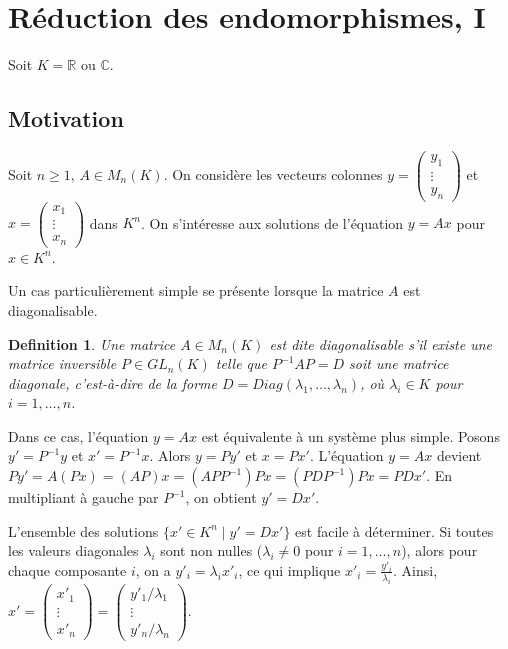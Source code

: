\documentclass{article}
\newtheorem{definition}{Definition}
\begin{document}
\sloppy

\section{Réduction des endomorphismes, I}

Soit $K = \mathbb{R}$ ou $\mathbb{C}$.

\subsection{Motivation}

Soit $n \ge 1$, $A \in M_n(K)$. On considère les vecteurs colonnes $y = \begin{pmatrix} y_1 \\ \vdots \\ y_n \end{pmatrix}$ et $x = \begin{pmatrix} x_1 \\ \vdots \\ x_n \end{pmatrix}$ dans $K^n$.
On s'intéresse aux solutions de l'équation $y = Ax$ pour $x \in K^n$.

Un cas particulièrement simple se présente lorsque la matrice $A$ est diagonalisable.

\begin{definition}
Une matrice $A \in M_n(K)$ est dite diagonalisable s'il existe une matrice inversible $P \in GL_n(K)$ telle que $P^{-1}AP = D$ soit une matrice diagonale, c'est-à-dire de la forme $D = Diag(\lambda_1, \ldots, \lambda_n)$, où $\lambda_i \in K$ pour $i=1, \ldots, n$.
\end{definition}

Dans ce cas, l'équation $y = Ax$ est équivalente à un système plus simple. Posons $y' = P^{-1}y$ et $x' = P^{-1}x$. Alors $y = Py'$ et $x = Px'$. L'équation $y = Ax$ devient $Py' = A(Px) = (AP)x = (APP^{-1})Px = (PDP^{-1})Px = PDx'$.
En multipliant à gauche par $P^{-1}$, on obtient $y' = Dx'$.

L'ensemble des solutions $\{ x' \in K^n \mid y' = Dx' \}$ est facile à déterminer. Si toutes les valeurs diagonales $\lambda_i$ sont non nulles ($\lambda_i \neq 0$ pour $i=1, \ldots, n$), alors pour chaque composante $i$, on a $y'_i = \lambda_i x'_i$, ce qui implique $x'_i = \frac{y'_i}{\lambda_i}$. Ainsi, $x' = \begin{pmatrix} x'_1 \\ \vdots \\ x'_n \end{pmatrix} = \begin{pmatrix} y'_1 / \lambda_1 \\ \vdots \\ y'_n / \lambda_n \end{pmatrix}$.
\end{document}
